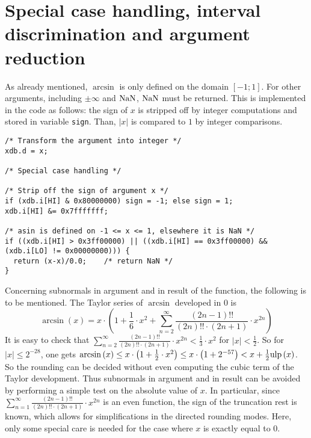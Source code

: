 \section{Special case handling, interval discrimination and argument reduction}\label{sec:asinargred}
As already mentioned, $\arcsin$ is only defined on the domain $\left[
  -1; 1 \right]$. For other arguments, including $\pm \infty$ and
$\mathrm{NaN}$, $\mathrm{NaN}$ must be returned. This is implemented in the code as
follows: the sign of $x$ is stripped off by integer computations and
stored in variable {\tt sign}. Than, $\left \vert x \right \vert$ is
compared to $1$ by integer comparisons.
\begin{lstlisting}[caption={Handling special cases - definition domain},firstnumber=1]
/* Transform the argument into integer */
xdb.d = x;

/* Special case handling */

/* Strip off the sign of argument x */
if (xdb.i[HI] & 0x80000000) sign = -1; else sign = 1;
xdb.i[HI] &= 0x7fffffff;

/* asin is defined on -1 <= x <= 1, elsewhere it is NaN */
if ((xdb.i[HI] > 0x3ff00000) || ((xdb.i[HI] == 0x3ff00000) && (xdb.i[LO] != 0x00000000))) {
  return (x-x)/0.0;    /* return NaN */
}
\end{lstlisting}

Concerning subnormals in argument and in result of the function, the
following is to be mentioned.  The Taylor series of $\arcsin$
developed in $0$ is $$\arcsin\left( x \right) = x \cdot \left( 1 +
\frac{1}{6} \cdot x^2 + \sum\limits_{n=2}^\infty \frac{\left( 2n - 1
\right)!!}{\left(2n\right)!! \cdot \left( 2n + 1 \right)} \cdot
x^{2n}\right)$$ It is easy to check that $\sum\limits_{n=2}^\infty
\frac{\left( 2n - 1 \right)!!}{\left(2n\right)!! \cdot \left( 2n + 1
\right)} \cdot x^{2n} < \frac{1}{3} \cdot x^2$ for $\left \vert x
\right \vert < \frac{1}{2}$. So for $\left \vert x \right \vert \leq
2^{-28}$, one gets $\arcsin\left( x \right) \leq x \cdot \left( 1 +
\frac{1}{2} \cdot x^2 \right) \leq x \cdot \left( 1 + 2^{-57} \right)
< x + \frac{1}{2} \mathrm{ulp}\left(x\right)$. So the rounding can be decided
without even computing the cubic term of the Taylor
development. Thus subnormals in argument and in result can be avoided
by performing a simple test on the absolute value of $x$. In
particular, since $\sum\limits_{n=1}^\infty \frac{\left( 2n - 1
\right)!!}{\left(2n\right)!! \cdot \left( 2n + 1 \right)} \cdot
x^{2n}$ is an even function, the sign of the truncation rest is known,
which allows for simplifications in the directed rounding modes. Here,
only some special care is needed for the case where $x$ is exactly
equal to $0$.

